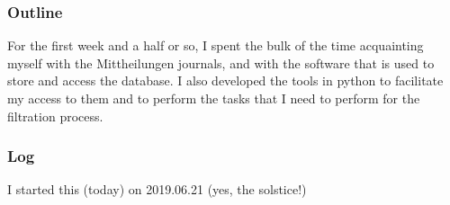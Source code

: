 \documentclass[12pt]{article}
\begin{document}
\subsubsection{Outline}

For the first week and a half or so, I spent the bulk of the time acquainting myself with the Mittheilungen journals, and with the software that is used to store and access the database. I also developed the tools in python to facilitate my access to them and to perform the tasks that I need to perform for the filtration process. 



\subsubsection{Log}
I started this (today) on 2019.06.21 (yes, the solstice!)
\end{document}
